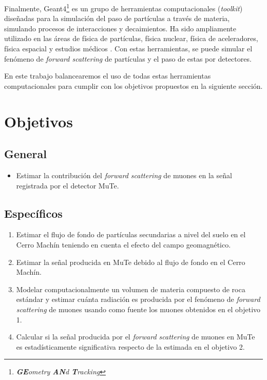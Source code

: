 \documentclass[12pt]{report}
\begin{document}
Finalmente, Geant4\footnote{\textit{\textbf{GE}ometry \textbf{AN}d \textbf{T}racking}} es un grupo de herramientas computacionales (\textit{toolkit}) diseñadas para la simulación del paso de partículas a través de materia, simulando procesos de interacciones y decaimientos. Ha sido ampliamente utilizado en las áreas de física de partículas, física nuclear, física de aceleradores, física espacial y estudios médicos \cite{agostinelli2003geant4}. Con estas herramientas, se puede simular el fenómeno de \textit{forward scattering} de partículas y el paso de estas por detectores.

En este trabajo balancearemos el uso de todas estas herramientas computacionales para cumplir con los objetivos propuestos en la siguiente sección.














\section*{Objetivos}

\subsection*{General}
\begin{itemize}
    \item Estimar la contribución del \textit{forward scattering} de muones en la señal registrada por el detector MuTe.
\end{itemize}

\subsection*{Específicos}
\begin{enumerate}
    \item Estimar el flujo de fondo de partículas secundarias a nivel del suelo en el Cerro Machín teniendo en cuenta el efecto del campo geomagnético.
    \item Estimar la señal producida en MuTe debido al flujo de fondo en el Cerro Machín.
    \item Modelar computacionalmente un volumen de materia compuesto de roca estándar y estimar cuánta radiación es producida por el fenómeno de \textit{forward scattering} de muones usando como fuente los muones obtenidos en el objetivo 1.
    \item Calcular si la señal producida por el \textit{forward scattering} de muones en MuTe es estadísticamente significativa respecto de la estimada en el objetivo 2.
\end{enumerate}
\end{document}
